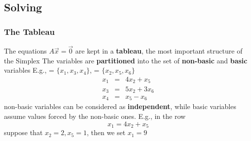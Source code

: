 \subsection{Solving}

\begin{frame}
  \frametitle{The Tableau}

  \scriptsize

  The equations $A\vec{x} = \vec{0}$ are kept in a {\bf tableau}, the most 
  important structure of the Simplex
  \vfill
  The variables are {\bf partitioned} into the set of {\bf non-basic} \nonbas
  and {\bf basic} \bas  variables 
  \vfill
  E.g., \bas = $\{ x_1, x_3, x_4 \}$, \nonbas = $\{ x_2, x_5, x_6 \}$
  $$
  \begin{array}{rcl}
    x_1 & = & 4 x_2 + x_5 \\
    x_3 & = & 5 x_2 + 3 x_6 \\
    x_4 & = & x_5 - x_6
  \end{array}
  $$
  \vfill
  non-basic variables can be considered as {\bf independent}, while basic variables
  assume values forced by the non-basic ones. E.g., in the row
  $$
    x_1 = 4 x_2 + x_5 
  $$
  suppose that $x_2 = 2, x_5 = 1$, then we set $x_1 = 9$

\end{frame}

